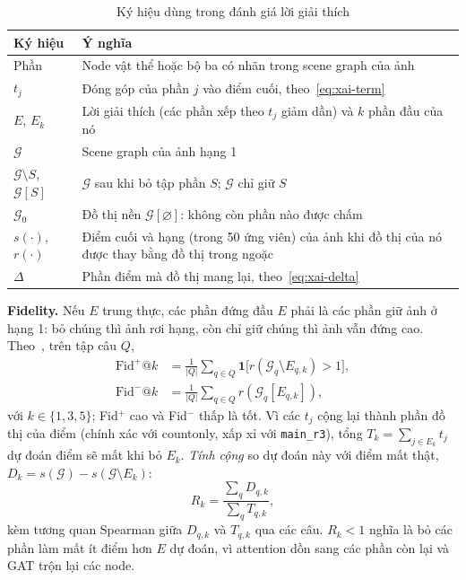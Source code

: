 \begin{table}[t]
\centering
\caption{Ký hiệu dùng trong đánh giá lời giải thích}
\label{tab:xai-notation}
\footnotesize
\renewcommand{\arraystretch}{1.2}
\begin{tabular}{@{}>{\raggedright\arraybackslash}p{}>{\raggedright\arraybackslash}p{}@{}}
\toprule
Ký hiệu & Ý nghĩa \\
\midrule
Phần & Node vật thể hoặc bộ ba có nhãn trong scene graph của ảnh \\
$t_j$ & Đóng góp của phần $j$ vào điểm cuối, theo~\eqref{eq:xai-term} \\
$E$, $E_k$ & Lời giải thích (các phần xếp theo $t_j$ giảm dần) và $k$ phần đầu của nó \\
$\mathcal{G}$ & Scene graph của ảnh hạng 1 \\
$\mathcal{G}\setminus S$, $\mathcal{G}[S]$ & $\mathcal{G}$ sau khi bỏ tập phần $S$; $\mathcal{G}$ chỉ giữ $S$ \\
$\mathcal{G}_0$ & Đồ thị nền $\mathcal{G}[\varnothing]$: không còn phần nào được chấm \\
$s(\cdot)$, $r(\cdot)$ & Điểm cuối và hạng (trong 50 ứng viên) của ảnh khi đồ thị của nó được thay bằng đồ thị trong ngoặc \\
$\Delta$ & Phần điểm mà đồ thị mang lại, theo~\eqref{eq:xai-delta} \\
\bottomrule
\end{tabular}
\end{table}

\textbf{Fidelity.} Nếu $E$ trung thực, các phần đứng đầu $E$ phải là các phần giữ ảnh ở hạng 1: bỏ chúng thì ảnh rơi hạng,
còn chỉ giữ chúng thì ảnh vẫn đứng cao. Theo~\cite{xai-yuan2023survey}, trên tập câu $Q$,
\begin{align}
  \mathrm{Fid}^{+}@k&=\frac{1}{|Q|}\sum_{q\in Q}\mathbf{1}\bigl[r(\mathcal{G}_q\setminus E_{q,k})>1\bigr],\label{eq:fid-plus}\\
  \mathrm{Fid}^{-}@k&=\frac{1}{|Q|}\sum_{q\in Q}r(\mathcal{G}_q[E_{q,k}]),\label{eq:fid-minus}
\end{align}
với $k\in\{1,3,5\}$; Fid$^{+}$ cao và Fid$^{-}$ thấp là tốt.
Vì các $t_j$ cộng lại thành phần đồ thị của điểm (chính xác với countonly, xấp xỉ với \texttt{main\_r3}),
tổng $T_k=\sum_{j\in E_k}t_j$ dự đoán điểm sẽ mất khi bỏ $E_k$. \emph{Tính
cộng} so dự đoán này với điểm mất thật, $D_k=s(\mathcal{G})-s(\mathcal{G}\setminus E_k)$:
\begin{equation}
  R_k=\frac{\sum_{q}D_{q,k}}{\sum_{q}T_{q,k}},
  \label{eq:additivity}
\end{equation}
kèm tương quan Spearman giữa $D_{q,k}$ và $T_{q,k}$ qua các câu. $R_k<1$ nghĩa là bỏ các phần làm mất ít điểm hơn $E$ dự đoán,
vì attention dồn sang các phần còn lại và GAT trộn lại các node.

